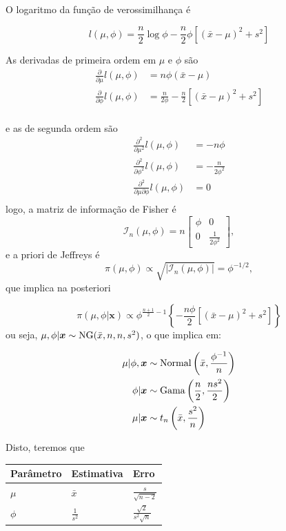 \documentclass[
  letterpaper,
  DIV=11,
  numbers=noendperiod]{scrreprt}
\theoremstyle{definition}
\theoremstyle{plain}
\theoremstyle{definition}
\theoremstyle{remark}
\begin{document}
O logaritmo da função de verossimilhança é

\[l(\mu,\phi)=\frac{n}{2}\log\phi -\frac{n}{2}\phi\left[(\bar{x}-\mu)^2 + s^2\right]\]

As derivadas de primeira ordem em \(\mu\) e \(\phi\) são \[\begin{align}
\frac{\partial}{\partial \mu}l(\mu,\phi)&=n\phi(\bar{x}-\mu)\\
\frac{\partial}{\partial \phi}l(\mu,\phi)&=\frac{n}{2\phi}-\frac{n}{2}\left[(\bar{x}-\mu)^2 + s^2\right]\\
\end{align}\]

e as de segunda ordem são \[\begin{align}
\frac{\partial^2}{\partial \mu^2}l(\mu,\phi)&=-n\phi\\
\frac{\partial^2}{\partial \phi^2}l(\mu,\phi)&=-\frac{n}{2\phi^2}\\
\frac{\partial^2}{\partial \mu\partial \phi}l(\mu,\phi)&=0\\
\end{align}
\] logo, a matriz de informação de Fisher é
\[\mathcal{I}_n(\mu,\phi)=n\left[\begin{array}{cc}\phi & 0 \\0 & \frac{1}{2\phi^2}\end{array}\right],\]
e a priori de Jeffreys é
\[\pi(\mu,\phi)\propto \sqrt{|\mathcal{I}_n(\mu,\phi)|}=\phi^{-1/2},\]
que implica na posteriori

\[\pi(\mu,\phi|\boldsymbol{x})\propto \phi^{\frac{n+1}{2}-1}\left\{-\frac{n\phi}{2}\left[(\bar{x}-\mu)^2 +s^2 \right]\right\}\]
ou seja, \(\mu,\phi|\boldsymbol{x}\sim\hbox{NG}(\bar{x},n,n,s^2)\), o
que implica em:

\[\begin{align}
\mu|\phi,\boldsymbol{x}&\sim\hbox{Normal}\left(\bar{x},\frac{\phi^{-1}}{n}\right)\\
\phi|\boldsymbol{x}&\sim\hbox{Gama}\left(\frac{n}{2},\frac{ns^2}{2}\right)\\
\mu|\boldsymbol{x}&\sim t_{n}\left(\bar{x},\frac{s^2}{n}\right)
\end{align}\]

Disto, teremos que

\begin{longtable}[]{@{}lll@{}}
\toprule\noalign{}
Parâmetro & Estimativa & Erro \\
\midrule\noalign{}
\endhead
\bottomrule\noalign{}
\endlastfoot
\(\mu\) & \(\bar{x}\) & \(\frac{s}{\sqrt{n-2}}\) \\
\(\phi\) & \(\frac{1}{s^{2}}\) & \(\frac{\sqrt{2}}{s^2\sqrt{n}}\) \\
\end{longtable}
\end{document}
